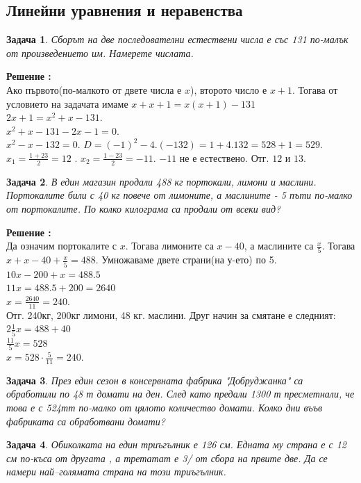 \documentclass{article}
\newtheorem{problem}{Задача}
\newcounter{solution}
\newcommand\solution{%
	\stepcounter{solution}%
	\textbf{Решение :}\\%
}
\begin{document}
\subsection{Линейни уравнения и неравенства}

\begin{problem}
	Сборът на две последователни естествени числа е със 131 по-малък от произведението им. Намерете числата.	
\end{problem}
\solution
 Ако първото(по-малкото от двете числа е $x$), второто число е $x+1$. Тогава от условието на задачата имаме 
 $ x + x+1 = x(x+1) - 131 $ \\ $2x + 1 = x^2 + x - 131.$ \\
 $x^2 + x - 131  -2x -1 = 0.$ \\
 $ x^2 -x -132 = 0.$
$D = (-1)^2 - 4.(-132) = 1 + 4.132 = 528+1 =529.$
$x_1 = \frac{1 +23}{2} = 12 $ . $x_2 = \frac{1 - 23}{2} = -11$. $-11$ не е естествено.
Отг. $12$ и $13$.

\begin{problem}
	В един магазин продали 488 кг портокали, лимони и маслини. Портокалите били с 40 кг повече от лимоните, а маслините - 5 пъти по-малко от портокалите. По колко килограма са продали от всеки вид?
\end{problem}
\solution Да означим портокалите с $x$. Тогава лимоните са $x-40 $, а маслините са $\frac{x}{5} $. Тогава $x + x - 40 + \frac{x}{5} = 488.$ Умножаваме двете страни(на у-ето) по 5. \\ $10x - 200 + x = 488.5 $ \\
$11x  = 488.5 + 200 = 2640 $ \\
$x = \frac{2640}{11} = 240 $. \\
Отг. 240кг, 200кг лимони, 48 кг. маслини.
Друг начин за смятане е следният:
$2\frac{1}{5}x = 488 + 40 $ \\
$ \frac{11}{5}x = 528 $ \\
$ x = 528 \cdot \frac{5}{11} = 240.$

\begin{problem}
	През един сезон в консервната фабрика "Добруджанка" са обработили по 48 т домати на ден. След като предали 1300 т пресметнали, че това е с 524тт по-малко от цялото количество домати. Колко дни въъв фабриката са обработвани домати?
\end{problem}


\begin{problem}
	Обиколката на един триъгълник е 126 см. Едната му страна е с 12 см по-къса от другата , а третатат е 3/ от сбора на првите две. Да се намери най--голямата страна на този триъгълник.
\end{problem}
\end{document}
